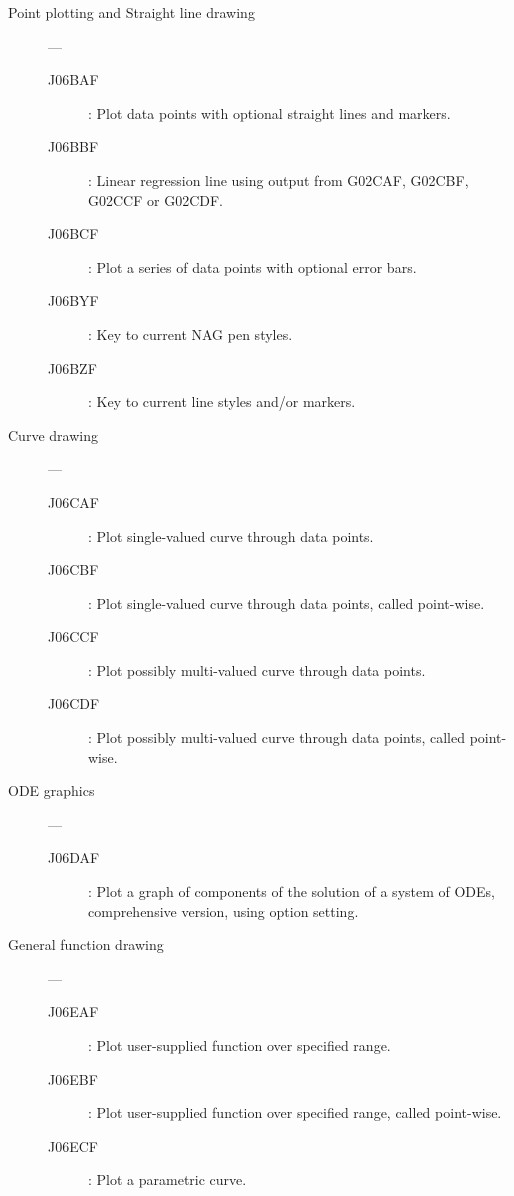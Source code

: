 \begin{description}
\item [Point plotting and Straight line drawing] ---

\begin{description}
\item [J06BAF] : Plot data points with optional straight lines and markers.
\item [J06BBF] : Linear regression line using output from G02CAF, G02CBF, G02CCF or G02CDF.
\item [J06BCF] : Plot a series of data points with optional error bars.
\item [J06BYF] : Key to current NAG pen styles.
\item [J06BZF] : Key to current line styles and/or markers.
\end{description}

\item [Curve drawing] ---

\begin{description}
\item [J06CAF] : Plot single-valued curve through data points.
\item [J06CBF] : Plot single-valued curve through data points, called point-wise.
\item [J06CCF] : Plot possibly multi-valued curve through data points.
\item [J06CDF] : Plot possibly multi-valued curve through data points, called point-wise.
\end{description}

\item [ODE graphics] ---

\begin{description}
\item [J06DAF] : Plot a graph of components of the solution of a system of ODEs, comprehensive version, using option setting.
\end{description}

\item [General function drawing] ---

\begin{description}
\item [J06EAF] : Plot user-supplied function over specified range.
\item [J06EBF] : Plot user-supplied function over specified range, called point-wise.
\item [J06ECF] : Plot a parametric curve.
\end{description}

\newpage


\end{description}

